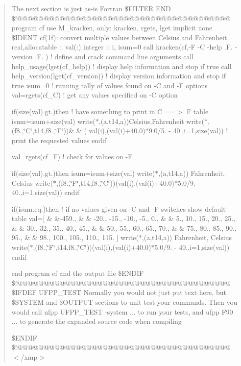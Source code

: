 \begin{quote}
The next section is just as-\/is Fortran \$\+F\+I\+L\+T\+ER E\+ND \$!@@@@@@@@@@@@@@@@@@@@@@@@@@@@@@@@@@@@@@@@ program cf use M\+\_\+kracken, only\+: kracken, rgets, lget implicit none \$\+I\+D\+E\+NT cf(1f)\+: convert multiple values between Celsius and Fahrenheit real,allocatable \+:\+: val(\+:) integer \+:\+: i, isum=0 call kracken(\textquotesingle{}cf\textquotesingle{},\textquotesingle{}-\/F -\/C -\/help .F. -\/version .F.\textquotesingle{} ) ! define and crack command line arguments call help\+\_\+usage(lget(\textquotesingle{}cf\+\_\+help\textquotesingle{})) ! display help information and stop if true call help\+\_\+version(lget(\textquotesingle{}cf\+\_\+version\textquotesingle{})) ! display version information and stop if true isum=0 ! running tally of values found on -\/C and -\/F options val=rgets(\textquotesingle{}cf\+\_\+C\textquotesingle{}) ! get any values specified on -\/C option

if(size(val).gt.)then ! have something to print in C ==$>$ F table isum=isum+size(val) write($\ast$,\textquotesingle{}(a,t14,a)\textquotesingle{})\textquotesingle{}Celsius\textquotesingle{},\textquotesingle{}Fahrenheit\textquotesingle{} write($\ast$,\textquotesingle{}(f8.,\char`\"{}\+C\char`\"{},t14,f8.,\char`\"{}\+F\char`\"{})\textquotesingle{})\& \& ( val(i),(val(i)+40.0)$\ast$9.0/5. -\/ 40.,i=1,size(val)) ! print the requested values endif

val=rgets(\textquotesingle{}cf\+\_\+F\textquotesingle{}) ! check for values on -\/F

if(size(val).gt.)then isum=isum+size(val) write($\ast$,\textquotesingle{}(a,t14,a)\textquotesingle{}) \textquotesingle{}Fahrenheit\textquotesingle{}, \textquotesingle{}Celsius\textquotesingle{} write($\ast$,\textquotesingle{}(f8.,\char`\"{}\+F\char`\"{},t14,f8.,\char`\"{}\+C\char`\"{})\textquotesingle{})(val(i),(val(i)+40.0)$\ast$5.0/9. -\/ 40.,i=1,size(val)) endif

if(isum.\+eq.)then ! if no values given on -\/C and -\/F switches show default table val=\mbox{[} \& \&-\/459., \& \& -\/20., -\/15., -\/10., -\/5., 0., \& \& 5., 10., 15., 20., 25., \& \& 30., 32., 35., 40., 45., \& \& 50., 55., 60., 65., 70., \& \& 75., 80., 85., 90., 95., \& \& 98., 100., 105., 110., 115. \mbox{]} write($\ast$,\textquotesingle{}(a,t14,a)\textquotesingle{}) \textquotesingle{}Fahrenheit\textquotesingle{}, \textquotesingle{}Celsius\textquotesingle{} write($\ast$,\textquotesingle{}(f8.,\char`\"{}\+F\char`\"{},t14,f8.,\char`\"{}\+C\char`\"{})\textquotesingle{})(val(i),(val(i)+40.0)$\ast$5.0/9. -\/ 40.,i=1,size(val)) endif

end program cf and the output file \$\+E\+N\+D\+IF \$!@@@@@@@@@@@@@@@@@@@@@@@@@@@@@@@@@@@@@@@@ \$\+I\+F\+D\+EF U\+F\+P\+P\+\_\+\+T\+E\+ST Normally you would not just put text here, but \$\+S\+Y\+S\+T\+EM and \$\+O\+U\+T\+P\+UT sections to unit test your commands. Then you would call ufpp U\+F\+P\+P\+\_\+\+T\+E\+ST -\/system ... to run your tests, and ufpp F90 ... to generate the expanded source code when compiling

\$\+E\+N\+D\+IF \$!@@@@@@@@@@@@@@@@@@@@@@@@@@@@@@@@@@@@@@@@ $<$/xmp$>$ \end{quote}
